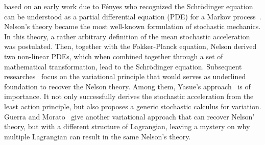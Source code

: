 \documentclass[%
 aip, 
 amsmath,amssymb,amsthm,
 nofootinbib,
 reprint,
]{revtex4-1}
\begin{document}
 based on an early work due to F\'{e}nyes who recognized the Schr\"{o}dinger equation can be understood as a partial differential equation (PDE) for a Markov process~\cite{Fenyes}. Nelson's theory became the most well-known formulation of stochastic mechanics. In this theory, a rather arbitrary definition of the mean stochastic acceleration was postulated. Then, together with the Fokker-Planck equation, Nelson derived two non-linear PDEs, which when combined together through a set of mathematical transformation, lead to the Schr\"{o}dinger equation. Subsequent researches~\cite{Yasue, Guerra, Pavon} focus on the variational principle that would serves as underlined foundation to recover the Nelson theory. Among them, Yasue's approach~\cite{Yasue} is of importance. It not only successfully derives the stochastic acceleration from the least action principle, but also proposes a generic stochastic calculus for variation. Guerra and Morato~\cite{Guerra} give another variational approach that can recover Nelson' theory, but with a different structure of Lagrangian, leaving a mystery on why multiple Lagrangian can result in the same Nelson's theory.
\end{document}
